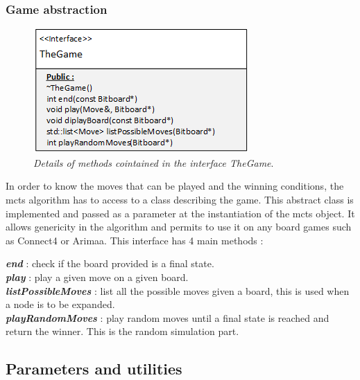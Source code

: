 \subsubsection{Game abstraction}
\begin{figure}[H] 
\centerline{\includegraphics[scale=0.8]{Data_Structure/Img/TheGame.png}}
\caption{\label{fig:thegamedetails}\textit{Details of methods cointained in the interface TheGame}.}
\end{figure}
In order to know the moves that can be played and the winning conditions, the mcts algorithm has to access to a class describing the game. This abstract class is implemented and passed as a parameter at the instantiation of the mcts object. It allows genericity in the algorithm and permits to use it on any board games such as Connect4 or Arimaa. This interface has 4 main methods : 

\noindent
\textit{\textbf{end}} : check if the board provided is a final state.
\medskip\\
\textit{\textbf{play}} : play a given move on a given board.
\medskip\\
\textit{\textbf{listPossibleMoves}} : list all the possible moves given a board, this is used when a node is to be expanded.
\medskip\\
\textit{\textbf{playRandomMoves}} : play random moves until a final state is reached and return the winner. This is the random simulation part.

\newpage
\subsection{Parameters and utilities}
